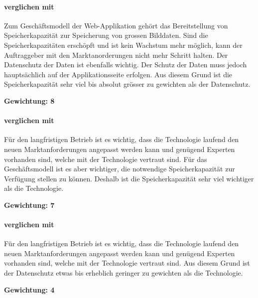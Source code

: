 \paragraph*{ verglichen mit }
Zum Geschäftsmodell der Web-Applikation gehört das Bereitstellung von Speicherkapazität zur Speicherung von grossen Bilddaten. Sind die Speicherkapazitäten erschöpft und ist kein Wachstum mehr möglich, kann der Auftraggeber mit den Marktanorderungen nicht mehr Schritt halten. Der Datenschutz der Daten ist ebenfalls wichtig. Der Schutz der Daten muss jedoch hauptsächlich auf der Applikationsseite erfolgen. Aus diesem Grund ist die Speicherkapazität sehr viel bis absolut grösser zu gewichten als der Datenschutz.

\textbf{Gewichtung: 8}

\paragraph*{ verglichen mit }
Für den langfristigen Betrieb ist es wichtig, dass die Technologie laufend den neuen Marktanforderungen angepasst werden kann und genügend Experten vorhanden sind, welche mit der Technologie vertraut sind. Für das Geschäftsmodell ist es aber wichtiger, die notwendige Speicherkapazität zur Verfügung stellen zu können. Deshalb ist die Speicherkapazität sehr viel wichtiger als die Technologie.

\textbf{Gewichtung: 7}

\paragraph*{ verglichen mit }
Für den langfristigen Betrieb ist es wichtig, dass die Technologie laufend den neuen Marktanforderungen angepasst werden kann und genügend Experten vorhanden sind, welche mit der Technologie vertraut sind. Aus diesem Grund ist der Datenschutz etwas bis erheblich geringer zu gewichten als die Technologie.

\textbf{Gewichtung: 4}

